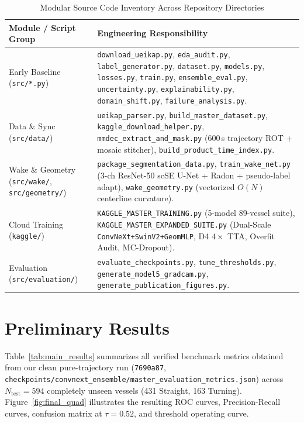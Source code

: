 \documentclass[11pt,a4paper]{article}
\begin{document}
\begin{table}[H]
\centering
\caption{Modular Source Code Inventory Across Repository Directories}
\label{tab:repo_modules}
{\small
\begin{tabularx}{\textwidth}{|l|X|}
\hline
\rowcolor{ruetgray}
\textbf{Module / Script Group} & \textbf{Engineering Responsibility} \\ \hline
Early Baseline (\texttt{src/*.py}) & \texttt{download\_ueikap.py}, \texttt{eda\_audit.py}, \texttt{label\_generator.py}, \texttt{dataset.py}, \texttt{models.py}, \texttt{losses.py}, \texttt{train.py}, \texttt{ensemble\_eval.py}, \texttt{uncertainty.py}, \texttt{explainability.py}, \texttt{domain\_shift.py}, \texttt{failure\_analysis.py}. \\ \hline
Data \& Sync (\texttt{src/data/}) & \texttt{ueikap\_parser.py}, \texttt{build\_master\_dataset.py}, \texttt{kaggle\_download\_helper.py}, \texttt{mmdec\_extract\_and\_mask.py} (600\,s trajectory ROT + mosaic stitcher), \texttt{build\_product\_time\_index.py}. \\ \hline
Wake \& Geometry (\texttt{src/wake/}, \texttt{src/geometry/}) & \texttt{package\_segmentation\_data.py}, \texttt{train\_wake\_net.py} (3-ch ResNet-50 scSE U-Net + Radon + pseudo-label adapt), \texttt{wake\_geometry.py} (vectorized $O(N)$ centerline curvature). \\ \hline
Cloud Training (\texttt{kaggle/}) & \texttt{KAGGLE\_MASTER\_TRAINING.py} (5-model 89-vessel suite), \texttt{KAGGLE\_MASTER\_EXPANDED\_SUITE.py} (Dual-Scale \texttt{ConvNeXt+SwinV2+GeomMLP}, D4 $4\times$ TTA, Overfit Audit, MC-Dropout). \\ \hline
Evaluation (\texttt{src/evaluation/}) & \texttt{evaluate\_checkpoints.py}, \texttt{tune\_thresholds.py}, \texttt{generate\_model5\_gradcam.py}, \texttt{generate\_publication\_figures.py}. \\ \hline
\end{tabularx}
}
\end{table}

\section{Preliminary Results}

Table~\ref{tab:main_results} summarizes all verified benchmark metrics obtained from our clean pure-trajectory run (\texttt{7690a87}, \texttt{checkpoints/convnext\_ensemble/master\_evaluation\_metrics.json}) across $N_{\text{test}}=594$ completely unseen vessels (431 Straight, 163 Turning). Figure~\ref{fig:final_quad} illustrates the resulting ROC curves, Precision-Recall curves, confusion matrix at $\tau=0.52$, and threshold operating curve.
\end{document}
